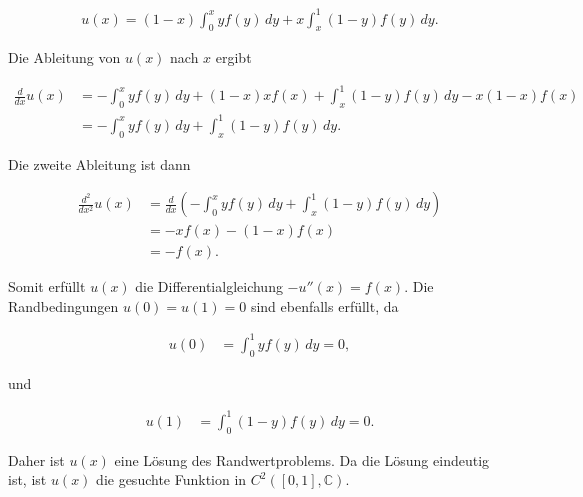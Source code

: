 \begin{align*}
u(x) = (1-x) \int_0^x y f(y) \, dy + x \int_x^1 (1-y) f(y) \, dy.
\end{align*}

Die Ableitung von \( u(x) \) nach \( x \) ergibt

\begin{align*}
\frac{d}{dx} u(x) &= -\int_0^x y f(y) \, dy + (1-x) x f(x) + \int_x^1 (1-y) f(y) \, dy - x(1-x) f(x) \\
&= -\int_0^x y f(y) \, dy + \int_x^1 (1-y) f(y) \, dy.
\end{align*}

Die zweite Ableitung ist dann

\begin{align*}
\frac{d^2}{dx^2} u(x) &= \frac{d}{dx} \left(-\int_0^x y f(y) \, dy + \int_x^1 (1-y) f(y) \, dy\right) \\
&= -x f(x) - (1-x) f(x) \\
&= -f(x).
\end{align*}

Somit erfüllt \( u(x) \) die Differentialgleichung \( -u''(x) = f(x) \). Die Randbedingungen \( u(0) = u(1) = 0 \) sind ebenfalls erfüllt, da

\begin{align*}
u(0) &= \int_0^1 y f(y) \, dy = 0,
\end{align*}

und

\begin{align*}
u(1) &= \int_0^1 (1-y) f(y) \, dy = 0.
\end{align*}

Daher ist \( u(x) \) eine Lösung des Randwertproblems. Da die Lösung eindeutig ist, ist \( u(x) \) die gesuchte Funktion in \( C^2([0,1], \mathbb{C}) \).

